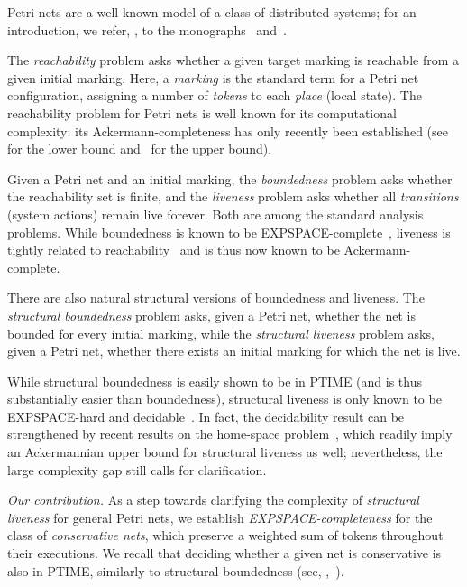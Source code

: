 

Petri nets are a well-known model of a class of distributed systems;
for an introduction, we refer, \eg, to the monographs~\cite{reisig2013} and~\cite{BestDevillers2024}.

The \emph{reachability} problem asks whether a given target marking is reachable from a given initial marking. Here, a \emph{marking} is the standard term for a Petri net configuration, assigning a number of \emph{tokens} to each \emph{place} (local state). The reachability problem for Petri nets is well known for its computational complexity: its Ackermann-completeness has only recently been established (see~\cite{DBLP:conf/focs/Leroux21,DBLP:conf/focs/CzerwinskiO21} for the lower bound and~\cite{DBLP:conf/lics/LerouxS19} for the upper bound).

Given a Petri net and an initial marking, the \emph{boundedness} problem asks whether the reachability set is finite, and the \emph{liveness} problem asks whether all \emph{transitions} (system actions) remain live forever. Both are among the standard analysis problems. While boundedness is known to be EXPSPACE-complete~\cite{DBLP:conf/stoc/CardozaLM76,DBLP:journals/tcs/Rackoff78}, liveness is tightly related to reachability~\cite{DBLP:conf/focs/Hack74} and is thus now known to be Ackermann-complete.


There are also natural structural versions of boundedness and liveness.
The \emph{structural boundedness} problem asks, given a Petri net, whether the net is bounded for every initial marking, while the \emph{structural liveness} problem asks, given a Petri net, whether there exists an initial marking for which the net is live.

While structural boundedness is easily shown to be in PTIME (and is thus substantially easier than boundedness), structural liveness is only known to be EXPSPACE-hard and decidable~\cite{DBLP:journals/acta/JancarP19}. In fact, the decidability result can be strengthened by recent results on the home-space problem~\cite{DBLP:conf/concur/JancarL23,DBLP:journals/lmcs/JancarL24}, which readily imply an Ackermannian upper bound for structural liveness as well; nevertheless, the large complexity gap still calls for clarification.


\emph{Our contribution.}
As a step towards clarifying the complexity of \emph{structural
liveness} for general Petri nets, we establish
\emph{EXPSPACE-completeness} for the class of \emph{conservative
nets}, which preserve a weighted sum of tokens throughout their
executions. We recall that deciding whether a given net is
conservative is also in PTIME, similarly to structural boundedness
(see, \eg,~\cite{DBLP:conf/apn/MayrW14}).

